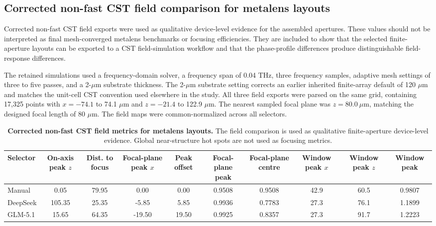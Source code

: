 \documentclass[final,1p,times]{elsarticle}
\begin{document}
\subsection{Corrected non-fast CST field comparison for metalens layouts}

Corrected non-fast CST field exports were used as qualitative device-level evidence for the assembled apertures. These values should not be interpreted as final mesh-converged metalens benchmarks or focusing efficiencies. They are included to show that the selected finite-aperture layouts can be exported to a CST field-simulation workflow and that the phase-profile differences produce distinguishable field-response differences.

The retained simulations used a frequency-domain solver, a frequency span of 0.04 THz, three frequency samples, adaptive mesh settings of three to five passes, and a 2-$\mu$m substrate thickness. The 2-$\mu$m substrate setting corrects an earlier inherited finite-array default of 120 $\mu$m and matches the unit-cell CST convention used elsewhere in the study. All three field exports were parsed on the same grid, containing 17,325 points with $x=-74.1$ to 74.1 $\mu$m and $z=-21.4$ to 122.9 $\mu$m. The nearest sampled focal plane was $z=80.0~\mu$m, matching the designed focal length of 80 $\mu$m. The field maps were common-normalized across all selectors.

\begin{table}[htbp!]
\centering
\caption{\textbf{Corrected non-fast CST field metrics for metalens layouts.}
The field comparison is used as qualitative finite-aperture device-level evidence. Global near-structure hot spots are not used as focusing metrics.}
\label{tab:si_phase6_metalens_field}
\footnotesize
\setlength{\tabcolsep}{2.8pt}
\renewcommand{\arraystretch}{1.12}
\begin{tabular}{lccccccccc}
\toprule
Selector & On-axis peak $z$ & Dist. to focus & Focal-plane peak $x$ & Peak offset & Focal-plane peak & Focal-plane centre & Window peak $x$ & Window peak $z$ & Window peak \\
\midrule
Manual & 0.05 & 79.95 & 0.00 & 0.00 & 0.9508 & 0.9508 & 42.9 & 60.5 & 0.9807 \\
DeepSeek & 105.35 & 25.35 & -5.85 & 5.85 & 0.9936 & 0.7783 & 27.3 & 76.1 & 1.1899 \\
GLM-5.1 & 15.65 & 64.35 & -19.50 & 19.50 & 0.9925 & 0.8357 & 27.3 & 91.7 & 1.2223 \\
\bottomrule
\end{tabular}
\end{table}
\end{document}
